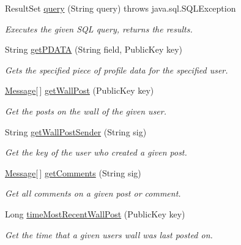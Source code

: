 \begin{DoxyCompactItemize}
Result\-Set \hyperlink{classballmerpeak_1_1turtlenet_1_1server_1_1Database_a4401c37a89ca60d2e6b926b9930446dc}{query} (String query)  throws java.\-sql.\-S\-Q\-L\-Exception 
\begin{DoxyCompactList}\small\item\em Executes the given S\-Q\-L query, returns the results. \end{DoxyCompactList}\item 
String \hyperlink{classballmerpeak_1_1turtlenet_1_1server_1_1Database_ab2e0d804fa40eb9b08275f2548737b34}{get\-P\-D\-A\-T\-A} (String field, Public\-Key key)
\begin{DoxyCompactList}\small\item\em Gets the specified piece of profile data for the specified user. \end{DoxyCompactList}\item 
\hyperlink{classballmerpeak_1_1turtlenet_1_1shared_1_1Message}{Message}\mbox{[}$\,$\mbox{]} \hyperlink{classballmerpeak_1_1turtlenet_1_1server_1_1Database_a095f1356c13e33debb06929244b98150}{get\-Wall\-Post} (Public\-Key key)
\begin{DoxyCompactList}\small\item\em Get the posts on the wall of the given user. \end{DoxyCompactList}\item 
String \hyperlink{classballmerpeak_1_1turtlenet_1_1server_1_1Database_a6c5618c6a7e144ee7eec9e6e4de6314d}{get\-Wall\-Post\-Sender} (String sig)
\begin{DoxyCompactList}\small\item\em Get the key of the user who created a given post. \end{DoxyCompactList}\item 
\hyperlink{classballmerpeak_1_1turtlenet_1_1shared_1_1Message}{Message}\mbox{[}$\,$\mbox{]} \hyperlink{classballmerpeak_1_1turtlenet_1_1server_1_1Database_a4f77bc5e3bdf13f836136bc7eb763cac}{get\-Comments} (String sig)
\begin{DoxyCompactList}\small\item\em Get all comments on a given post or comment. \end{DoxyCompactList}\item 
Long \hyperlink{classballmerpeak_1_1turtlenet_1_1server_1_1Database_a4b2795d1417e265aa345d21e5e1c3a23}{time\-Most\-Recent\-Wall\-Post} (Public\-Key key)
\begin{DoxyCompactList}\small\item\em Get the time that a given users wall was last posted on. \end{DoxyCompactList}\item 

\end{DoxyCompactItemize}

